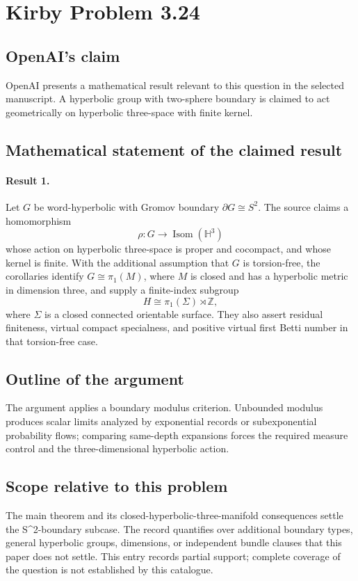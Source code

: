 \documentclass[11pt]{article}
\begin{document}
\section*{Kirby Problem 3.24}

\subsection{OpenAI's claim}
OpenAI presents a mathematical result relevant to this question in the selected manuscript. A hyperbolic group with two-sphere boundary is claimed to act geometrically on hyperbolic three-space with finite kernel.

\subsection{Mathematical statement of the claimed result}
\paragraph{Result 1.} Let \(G\) be word-hyperbolic with Gromov boundary \(\partial G\cong S^2\). The source claims a homomorphism
\[
 \rho:G\longrightarrow\operatorname{Isom}(\mathbb H^3)
\]
whose action on hyperbolic three-space is proper and cocompact, and whose kernel is finite. With the additional assumption that \(G\) is torsion-free, the corollaries identify \(G\cong\pi_1(M)\), where \(M\) is closed and has a hyperbolic metric in dimension three, and supply a finite-index subgroup
\[
 H\cong\pi_1(\Sigma)\rtimes\mathbb Z,
\]
where \(\Sigma\) is a closed connected orientable surface. They also assert residual finiteness, virtual compact specialness, and positive virtual first Betti number in that torsion-free case.

\subsection{Outline of the argument}
The argument applies a boundary modulus criterion. Unbounded modulus produces scalar limits analyzed by exponential records or subexponential probability flows; comparing same-depth expansions forces the required measure control and the three-dimensional hyperbolic action.

\subsection{Scope relative to this problem}
The main theorem and its closed-hyperbolic-three-manifold consequences settle the S\textasciicircum{}2-boundary subcase. The record quantifies over additional boundary types, general hyperbolic groups, dimensions, or independent bundle clauses that this paper does not settle. This entry records partial support; complete coverage of the question is not established by this catalogue.
\end{document}
